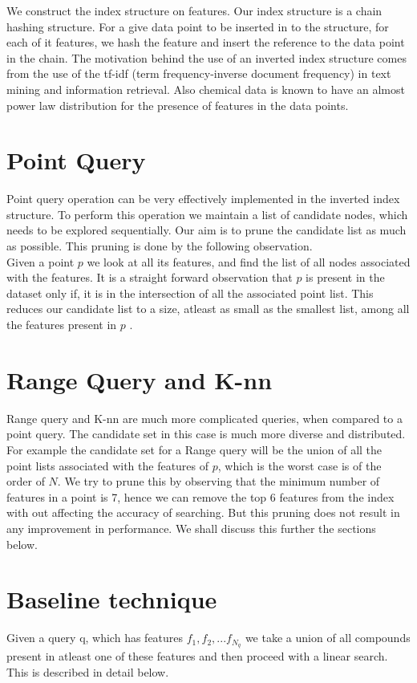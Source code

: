 
We construct the index structure on features. Our index structure is a chain hashing structure. For a give data point to be inserted in to the structure, for each of it features, we hash the feature and insert the reference to the data point in the chain. The motivation behind the use of an inverted index structure comes from the use of the tf-idf (term frequency-inverse document frequency) in text mining and information retrieval. Also chemical data is known to have an almost power law distribution for the presence of features in the data points.

\section{Point Query}

Point query operation can be very effectively 
implemented in the inverted index structure. To perform this operation we maintain a list of candidate nodes, which needs to be explored sequentially. Our aim is to prune the candidate list as much as possible. This pruning is done by the following observation.\\
Given a point $p$ we look at all its features, and find the list of all nodes associated with the features. It is a straight forward observation that $p$ is present in the dataset only if, it is in the intersection of all the associated point list. This reduces our candidate list to a size, atleast as small as the smallest list, among all the features present in $p$ .\\

\section{Range Query and K-nn}
Range query and K-nn are much more complicated queries, when compared to a point query. The candidate set in this case is much more diverse and distributed. For example the candidate set for a Range query will be the union of all the point lists associated with the features of $p$, which is the worst case is of the order of $N$. We try to prune this by observing that the minimum number of features in a point is 7, hence we can remove the top 6 features from the index with out affecting the accuracy of searching. But this pruning does not result in any improvement in performance. We shall discuss this further the sections below.\\

\section{Baseline technique}
 Given a query q, which has features $f_1, f_2,...f_{N_q}$ we take a union of all compounds present in atleast one of these features and then proceed with a linear search. This is described in detail below.

